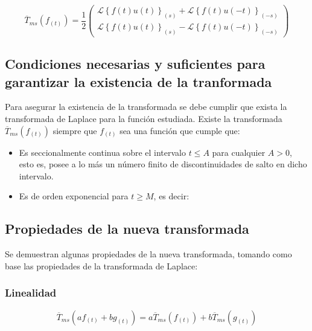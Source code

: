 \documentclass[12pt]{article}
\begin{document}
\begin{equation}
\overline{T}_{ms}(f_{(t)}) = \frac12
\begin{pmatrix}
\mathcal{L}\left\{f(t)u(t)\right\}_{(s)} +  \mathcal{L}\left\{f(t)u(-t)\right\}_{(-s)}\\[0.2 cm]
\mathcal{L}\left\{f(t)u(t)\right\}_{(s)} -  \mathcal{L}\left\{f(t)u(-t)\right\}_{(-s)}
\end{pmatrix}
\label{transformada_con_laplace}
\end{equation}

\subsection{Condiciones necesarias y suficientes para garantizar la existencia de la tranformada}

Para asegurar la existencia de la transformada se debe cumplir que exista la transformada de Laplace para la función estudiada. Existe la transformada $\overline{T}_{ms}(f_{(t)})$ siempre que $f_{(t)}$ sea una función que cumple que:

\begin{itemize}
\item Es seccionalmente continua sobre el intervalo $t \le A$ para cualquier $A > 0$, esto es, posee a lo más un número finito de discontinuidades de salto en dicho intervalo.
\item Es de orden exponencial para $t \ge M$, es decir:
\end{itemize}


\subsection{Propiedades de la nueva transformada}


Se demuestran algunas propiedades de la nueva transformada, tomando como base las propiedades de la transformada de Laplace:


\subsubsection{Linealidad}

\begin{equation}
 \overline{T}_{ms}(a f_{(t)} + b g_{(t)}) = a \overline{T}_{ms}(f_{(t)}) + b  \overline{T}_{ms}(g_{(t)})
\label{linealidad}
\end{equation}
\end{document}
